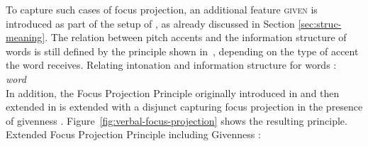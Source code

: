 \documentclass[output=paper
	        ,collection
	        ,collectionchapter
 	        ,biblatex
                ,babelshorthands
                ,newtxmath
                ,draftmode
                ,colorlinks, citecolor=brown
]{langscibook}
\begin{document}
To capture such cases of focus projection, an additional feature
\textsc{given} is introduced as part of the setup of
\cite{deKuthy2002a}, as already discussed in Section \ref{sec:struc-meaning}. The
relation between pitch accents and the information structure of words
is still defined by the principle shown in~,
depending on the type of accent the word receives.
\ea
Relating intonation and information structure for words \citep{DeKuthy.Meurers-11}:\\
    \emph{word}\quad \impl \\
    \label{fig:words2}
\z
In addition, the Focus Projection Principle originally introduced in \cite{deKuthy2002a} and then extended in \cite{dKM2003a} is extended with a disjunct capturing focus
projection in the presence of givenness \citep{DeKuthy.Meurers-11}. Figure~\ref{fig:verbal-focus-projection} shows the resulting principle.
\ea
Extended Focus Projection Principle including Givenness \citep{DeKuthy.Meurers-11}:\\
\end{document}
